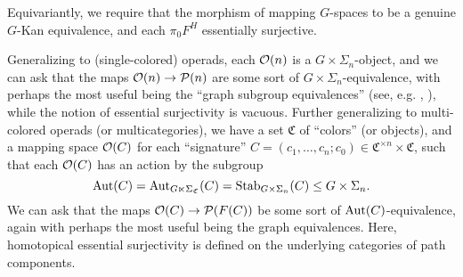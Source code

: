 \documentclass[a4paper,10pt
,draft
]{article}%
\renewcommand{\1}{\eta}%
\begin{document}
Equivariantly, we require that the morphism of mapping $G$-spaces to be a genuine $G$-Kan equivalence, and
each $\pi_0F^H$ essentially surjective.

Generalizing to (single-colored) operads,
each $\mathcal{O}(n)$ is a $G \times \Sigma_n$-object, and we can ask that the maps $\mathcal{O}(n) \to \mathcal{P}(n)$ are some sort of $G \times \Sigma_n$-equivalence,
with perhaps the most useful being the ``graph subgroup equivalences'' (see, e.g. \cite{BP_geo}, \cite{BH15}),
while the notion of essential surjectivity is vacuous.
Further generalizing to multi-colored operads (or multicategories),
we have a set $\mathfrak C$ of ``colors'' (or objects),
and a mapping space $\mathcal{O}(C)$ for each ``signature'' $C = (c_1, \dots, c_n; c_0) \in \mathfrak C^{\times n} \times \mathfrak C$,
such that each $\mathcal{O}(C)$ has an action by the subgroup
\[
      \operatorname{Aut}(C) = \operatorname{Aut}_{G \ltimes \Sigma_{\mathfrak C}}(C) = \mathrm{Stab}_{G \times \Sigma_n}(C) \leq G \times \Sigma_n.
\]
We can ask that the maps $\mathcal{O}(C) \to \mathcal{P}(F(C))$ be some sort of $\operatorname{Aut}(C)$-equivalence,
again with perhaps the most useful being the graph equivalences.
Here, homotopical essential surjectivity is defined on the underlying categories of path components.
\end{document}
